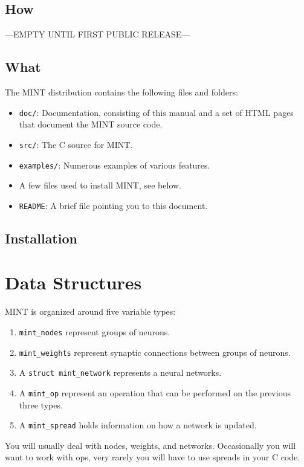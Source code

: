 \documentclass[12pt,letterpaper]{memoir}
\newcommand{\mint}{MINT\xspace}
\begin{document}
\section{How}

---EMPTY UNTIL FIRST PUBLIC RELEASE--- 

\section{What}

The \mint distribution contains the following files and folders:
\begin{itemize}
\item \lstinline{doc/}: Documentation, consisting of this manual and a
  set of HTML pages that document the \mint source code.
\item \lstinline{src/}: The C source for \mint.
\item \lstinline{examples/}: Numerous examples of various features.
\item A few files used to install \mint, see below.
\item \lstinline{README}: A brief file pointing you to this document.
\end{itemize}

\section{Installation}


\chapter{Data Structures}
\label{cha:mint-data-structures}

\mint is organized around five variable types:
\begin{enumerate}
\item \lstinline{mint_nodes} represent groups of neurons.
\item \lstinline{mint_weights} represent synaptic connections between
  groups of neurons.
\item A \lstinline{struct mint_network} represents a neural networks.
\item A \lstinline{mint_op} represent an operation that can be
  performed on the previous three types.
\item A \lstinline{mint_spread} holds information on how a network is
  updated.
\end{enumerate}
You will usually deal with nodes, weights, and networks. Occasionally
you will want to work with ops, very rarely you will have to use
spreads in your C code.
\end{document}
